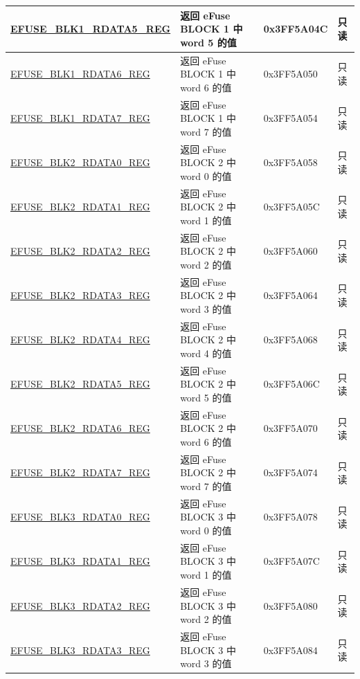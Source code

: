 \begin{longtable}{ | p{5cm} | p{7.5cm} | p{2cm} | p{1cm} | }
    \hyperref[regdesc:EFUSEBLK1RDATAnREG]{EFUSE\_BLK1\_RDATA5\_REG} & 返回 eFuse BLOCK 1 中 word 5 的值 & 0x3FF5A04C & 只读 \\ \hline
    \hyperref[regdesc:EFUSEBLK1RDATAnREG]{EFUSE\_BLK1\_RDATA6\_REG} & 返回 eFuse BLOCK 1 中 word 6 的值 & 0x3FF5A050 & 只读 \\ \hline
    \hyperref[regdesc:EFUSEBLK1RDATAnREG]{EFUSE\_BLK1\_RDATA7\_REG} & 返回 eFuse BLOCK 1 中 word 7 的值 & 0x3FF5A054 & 只读 \\ \hline
    \hyperref[regdesc:EFUSEBLK2RDATAnREG]{EFUSE\_BLK2\_RDATA0\_REG} & 返回 eFuse BLOCK 2 中 word 0 的值 & 0x3FF5A058 & 只读 \\ \hline
    \hyperref[regdesc:EFUSEBLK2RDATAnREG]{EFUSE\_BLK2\_RDATA1\_REG} & 返回 eFuse BLOCK 2 中 word 1 的值 & 0x3FF5A05C & 只读 \\ \hline
    \hyperref[regdesc:EFUSEBLK2RDATAnREG]{EFUSE\_BLK2\_RDATA2\_REG} & 返回 eFuse BLOCK 2 中 word 2 的值 & 0x3FF5A060 & 只读 \\ \hline
    \hyperref[regdesc:EFUSEBLK2RDATAnREG]{EFUSE\_BLK2\_RDATA3\_REG} & 返回 eFuse BLOCK 2 中 word 3 的值 & 0x3FF5A064 & 只读 \\ \hline
    \hyperref[regdesc:EFUSEBLK2RDATAnREG]{EFUSE\_BLK2\_RDATA4\_REG} & 返回 eFuse BLOCK 2 中 word 4 的值 & 0x3FF5A068 & 只读 \\ \hline
    \hyperref[regdesc:EFUSEBLK2RDATAnREG]{EFUSE\_BLK2\_RDATA5\_REG} & 返回 eFuse BLOCK 2 中 word 5 的值 & 0x3FF5A06C & 只读 \\ \hline
    \hyperref[regdesc:EFUSEBLK2RDATAnREG]{EFUSE\_BLK2\_RDATA6\_REG} & 返回 eFuse BLOCK 2 中 word 6 的值 & 0x3FF5A070 & 只读 \\ \hline
    \hyperref[regdesc:EFUSEBLK2RDATAnREG]{EFUSE\_BLK2\_RDATA7\_REG} & 返回 eFuse BLOCK 2 中 word 7 的值 & 0x3FF5A074 & 只读 \\ \hline
    \hyperref[regdesc:EFUSEBLK3RDATAnREG]{EFUSE\_BLK3\_RDATA0\_REG} & 返回 eFuse BLOCK 3 中 word 0 的值 & 0x3FF5A078 & 只读 \\ \hline
    \hyperref[regdesc:EFUSEBLK3RDATAnREG]{EFUSE\_BLK3\_RDATA1\_REG} & 返回 eFuse BLOCK 3 中 word 1 的值& 0x3FF5A07C & 只读 \\ \hline
    \hyperref[regdesc:EFUSEBLK3RDATAnREG]{EFUSE\_BLK3\_RDATA2\_REG} & 返回 eFuse BLOCK 3 中 word 2 的值& 0x3FF5A080 & 只读 \\ \hline
    \hyperref[regdesc:EFUSEBLK3RDATAnREG]{EFUSE\_BLK3\_RDATA3\_REG} & 返回 eFuse BLOCK 3 中 word 3 的值& 0x3FF5A084 & 只读 \\ \hline

\end{longtable}
